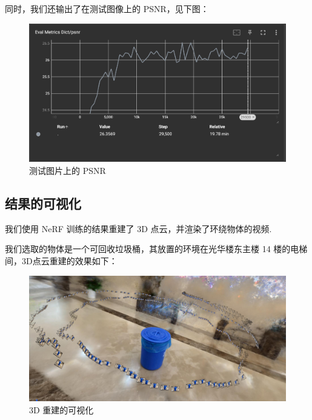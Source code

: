 \documentclass[notitlepage,cs4size,punct,oneside]{ctexrep}
\numberwithin{equation}{chapter}
\theoremstyle{mystyle}
\begin{document}
同时，我们还输出了在测试图像上的 PSNR，见下图：

\begin{figure}
    \centering
    \includegraphics[width=1\linewidth]{psnr.png}
    \caption{测试图片上的 PSNR}
    \label{fig:enter-label}
\end{figure}

\subsection{结果的可视化}

我们使用 NeRF 训练的结果重建了 3D 点云，并渲染了环绕物体的视频.

我们选取的物体是一个可回收垃圾桶，其放置的环境在光华楼东主楼 14 楼的电梯间，3D点云重建的效果如下：

\begin{figure}
    \centering
    \includegraphics[width=1\linewidth]{3drecon.png}
    \caption{3D 重建的可视化}
    \label{fig:enter-label}
\end{figure}
\end{document}
